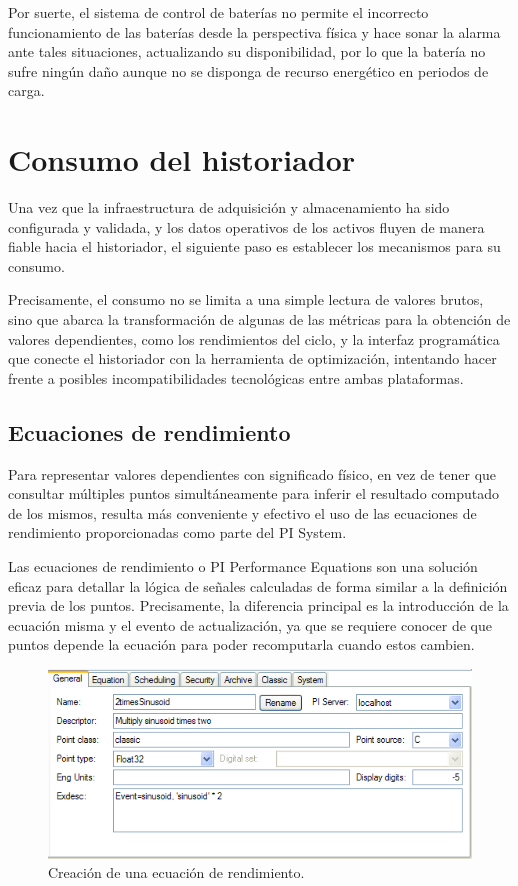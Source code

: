 Por suerte, el sistema de control de baterías no permite el incorrecto funcionamiento de las baterías desde la perspectiva física y hace sonar la alarma ante tales situaciones, actualizando su disponibilidad, por lo que la batería no sufre ningún daño aunque no se disponga de recurso energético en periodos de carga.

\section{Consumo del historiador}%
\label{makereference3.5}

Una vez que la infraestructura de adquisición y almacenamiento ha sido configurada y validada, y los datos operativos de los activos fluyen de manera fiable hacia el historiador, el siguiente paso es establecer los mecanismos para su consumo.

Precisamente, el consumo no se limita a una simple lectura de valores brutos, sino que abarca la transformación de algunas de las métricas para la obtención de valores dependientes, como los rendimientos del ciclo, y la interfaz programática que conecte el historiador con la herramienta de optimización, intentando hacer frente a posibles incompatibilidades tecnológicas entre ambas plataformas.

\subsection{Ecuaciones de rendimiento}%
\label{makereference3.5.1}

Para representar valores dependientes con significado físico, en vez de tener que consultar múltiples puntos simultáneamente para inferir el resultado computado de los mismos, resulta más conveniente y efectivo el uso de las ecuaciones de rendimiento proporcionadas como parte del PI System.

Las ecuaciones de rendimiento o PI Performance Equations son una solución eficaz para detallar la lógica de señales calculadas de forma similar a la definición previa de los puntos. Precisamente, la diferencia principal es la introducción de la ecuación misma y el evento de actualización, ya que se requiere conocer de que puntos depende la ecuación para poder recomputarla cuando estos cambien.

\begin{figure}
  \centering
  \includegraphics[width=0.5\linewidth]{figures/ecuaciones-de-rendimiento.png}
  \caption[Creación de una ecuación de rendimiento.]{Creación de una ecuación de rendimiento.}%
  \label{fig:ecuaciones-de-rendimiento}
\end{figure}

